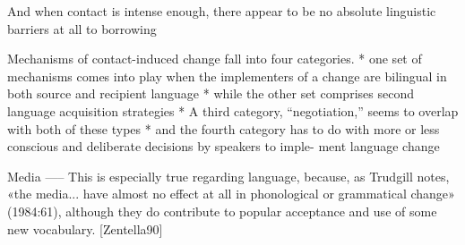 And when contact is intense enough, there appear to be no absolute linguistic
barriers at all to borrowing


Mechanisms of contact-induced change fall into four categories.
* one set of mechanisms comes into play when the implementers of a
change are bilingual in both source and recipient language
* while the other set comprises second language
acquisition strategies
* A third category, “negotiation,” seems to
overlap with both of these types
* and the fourth category has to
do with more or less conscious and deliberate decisions by speakers to imple-
ment language change



Media
-----
This is especially true regarding language, because, as Trudgill notes, «the media... have almost no effect at all in
phonological or grammatical change» (1984:61), although they do contribute to popular acceptance and
use of some new vocabulary. [Zentella90]

